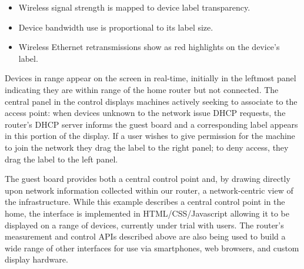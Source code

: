 \begin{itemize} \vspace{-0.5em}
\item Wireless signal strength is mapped to device label transparency.
\item Device bandwidth use is proportional to its label size.
\item Wireless Ethernet retransmissions show as red highlights on the device's
  label. %
\end{itemize}

Devices in range appear on the screen in real-time, initially in the leftmost
panel indicating they are within range of the home router but not connected.
The central panel in the control displays machines actively seeking to associate
to the access point:
when devices unknown to the network issue DHCP requests, the router's DHCP
server informs the guest board and a corresponding label appears in this portion
of the display.  If a user wishes to give permission for the machine to join the
network they drag the label to the right panel; to deny access, they drag the
label to the left panel.

The guest board provides both a central control point and, by drawing directly
upon network information collected within our router, a network-centric view of
the infrastructure.  While this example describes a central control point in the
home, the interface is implemented in HTML/CSS/Javascript allowing it to be
displayed on a range of devices, currently under trial with users.  The router's
measurement and control APIs described above are also being used to build a wide
range of other interfaces for use via smartphones, web browsers, and custom
display hardware.




